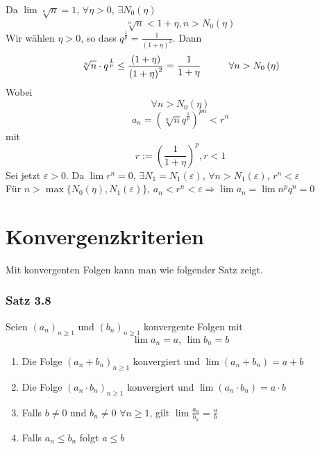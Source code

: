 Da $\lim\sqrt[n]{n}=1$, $\forall\eta >0$, $\exists N_0(\eta)$ \[\sqrt[n]{n}<1+\eta, n>N_0(\eta)\]
Wir wählen $\eta >0$, so dass ${q^{\frac{1}{p}}} = \frac{1}{{{{\left( {1 + \eta } \right)}^2}}}$. Dann
\[\sqrt[n]{n}\cdot q^{\frac{1}{p}}\leq\frac{\left( 1+\eta\right)}{\left( 1+\eta\right)^2}=\frac{1}{1+\eta}\hspace{10mm} \forall n>N_0\left(\eta\right)\]
Wobei \[\forall n>N_0\left(\eta\right)\]\[a_n=\left( \sqrt[n]{n}q^{\frac{1}{p}}\right)^{pn}<r^n\] mit \[r:=\left( \frac{1}{1+\eta}\right)^p, r<1\]
Sei jetzt $\varepsilon>0$. Da $\lim r^n=0$, $\exists N_1=N_1(\varepsilon)$, $\forall n>N_1(\varepsilon)$, $r^n<\varepsilon$\\

\noindent Für $n>\max\{N_0\left(\eta\right), N_1(\varepsilon)\}$, $a_n<r^n<\varepsilon \Rightarrow \lim a_n=\lim n^pq^n=0$

\section{Konvergenzkriterien}
Mit konvergenten Folgen kann man  wie folgender Satz zeigt.
\subsubsection*{Satz 3.8}
Seien $\left( a_n\right)_{n\geq 1}$ und $\left( b_n\right)_{n\geq 1}$ konvergente Folgen mit
\[\lim a_n=a\text{, }\lim b_n=b\]
\begin{enumerate}[\hspace{2mm}i)]
\item Die Folge $\left( a_n+b_n\right)_{n\geq 1}$ konvergiert und $\lim\left( a_n+b_n\right)=a+b$
\item Die Folge $\left( a_n\cdot b_n\right)_{n\geq 1}$ konvergiert und $\lim\left( a_n\cdot b_n\right)=a\cdot b$
\item Falls $b\not=0$ und $b_n\not=0$ $\forall n\geq 1$, gilt $\lim\frac{a_n}{b_n}=\frac{a}{b}$
\item Falls $a_n\leq b_n$ folgt $a\leq b$
\end{enumerate}

